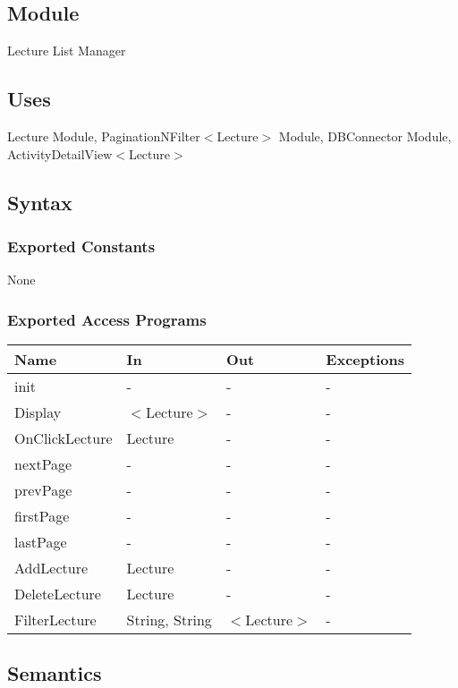 \documentclass[12pt, titlepage]{article}
\begin{document}
\subsection{Module}

Lecture List Manager

\subsection{Uses}

Lecture Module, PaginationNFilter$<$Lecture$>$ Module, DBConnector Module,\\ ActivityDetailView$<$Lecture$>$

\subsection{Syntax}

\subsubsection{Exported Constants}
None

\subsubsection{Exported Access Programs}
\begin{center}
\begin{tabular}{p{4cm} p{2cm} p{4cm} p{4cm}}
\hline
\textbf{Name} & \textbf{In} & \textbf{Out} & \textbf{Exceptions} \\
\hline
init & - & - & -\\
Display & $<$Lecture$>$ & - & - \\
OnClickLecture & Lecture & - & -\\ 
nextPage & - & - &  -\\
prevPage & - & - &  -\\
firstPage & - & - &  -\\
lastPage & - & - &  -\\
AddLecture & Lecture & - & - \\
DeleteLecture & Lecture & - & - \\
FilterLecture & String, String & $<$Lecture$>$ & - \\
\hline
\end{tabular}
\end{center}

\subsection{Semantics}
\end{document}
